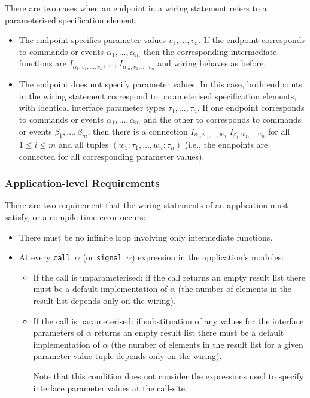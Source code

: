 \documentclass[11pt,letterpaper]{article}
\newcommand{\code}[1]{{\tt #1}}
\begin{document}
There are two cases when an endpoint in a wiring statement refers to a
parameterised specification element:
\begin{itemize}
\item The endpoint specifies parameter values $v_1, \ldots, v_n$. If the
endpoint corresponds to commands or events $\alpha_1, \ldots, \alpha_m$
then the corresponding intermediate functions are
$I_{\alpha_1,v_1,\ldots,v_n}$, \ldots, $I_{\alpha_m,v_1,\ldots,v_n}$ and
wiring behaves as before.
\item The endpoint does not specify parameter values. In this case, both
endpoints in the wiring statement correspond to parameterised specification
elements, with identical interface parameter types $\tau_1, \ldots,
\tau_n$. If one endpoint corresponds to commands or events $\alpha_1,
\ldots, \alpha_m$ and the other to corresponds to commands or events
$\beta_1, \ldots, \beta_m$, then there is a connection $I_{\alpha_i, w_1,
\ldots, w_n}$ \code{<->} $I_{\beta_i, w_1,\ldots, w_n}$ for all $1 \leq i
\leq m$ and all tuples $(w_1:\tau_1, \ldots, w_n:\tau_n)$ (i.e., the
endpoints are connected for all corresponding parameter values).
\end{itemize}

\subsubsection{Application-level Requirements}
\label{sec:wiring-reqs}

There are two requirement that the wiring statements of an application must
satisfy, or a compile-time error occurs:
\begin{itemize}
\item There must be no infinite loop involving only intermediate functions.
\item At every \code{call $\alpha$} (or \code{signal $\alpha$}) expression
in the application's modules:
\begin{itemize}
\item If the call is unparameterised: if the call returns an empty result
list there must be a default implementation of $\alpha$ (the number of
elements in the result list depends only on the wiring).
\item If the call is parameterised: if substituation of any values for the
interface parameters of $\alpha$ returns an empty result list there must be
a default implementation of $\alpha$ (the number of elements in the result
list for a given parameter value tuple depends only on the wiring).

Note that this condition does not consider the expressions used to specify
interface parameter values at the call-site.
\end{itemize}
\end{itemize}
\end{document}
